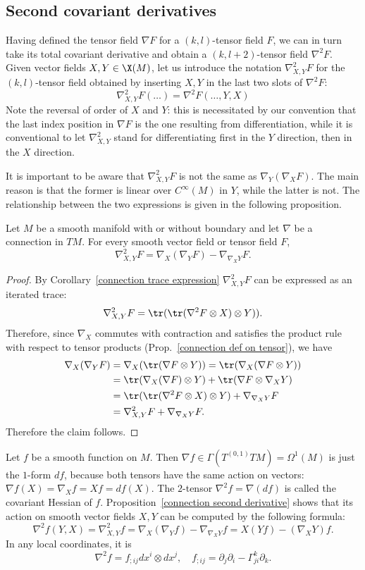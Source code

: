 \subsection{Second covariant derivatives}
Having defined the tensor field $\nabla F$ for a $(k,l)$-tensor field $F$, we can in turn take 
its total covariant derivative and obtain a $(k,l+2)$-tensor field $\nabla^2F$. Given vector 
fields $X,Y\in\X(M)$, let us introduce the notation $\nabla^2_{X,Y}F$ for the $(k,l)$-tensor 
field obtained by inserting $X,Y$ in the last two slots of $\nabla^2F$:
\[\nabla^2_{X,Y}F(\dots)=\nabla^2F(\dots,Y,X)\]
Note the reversal of order of $X$ and $Y$: this is necessitated by our convention that the 
last index position in $\nabla F$ is the one resulting from differentiation, while it is 
conventional to let $\nabla^2_{X,Y}$ stand for differentiating first in the $Y$ direction, 
then in the $X$ direction.\par
It is important to be aware that $\nabla^2_{X,Y}F$ is not the same as $\nabla_Y(\nabla_XF)$. 
The main reason is that the former is linear over $C^{\infty}(M)$ in $Y$, while the latter 
is not. The relationship between the two expressions is given in the following proposition.
\begin{proposition}\label{connection second derivative}
Let $M$ be a smooth manifold with or without boundary and let $\nabla$ be a connection in $TM$. 
For every smooth vector field or tensor field $F$,
\[\nabla^2_{X,Y}F=\nabla_X(\nabla_YF)-\nabla_{\nabla_XY}F.\]
\end{proposition}
\begin{proof}
By Corollary~\ref{connection trace expression} $\nabla^2_{X,Y}F$ can be expressed as an iterated trace:
\[\nabla^2_{X,Y}F=\tr(\tr(\nabla^2F\otimes X)\otimes Y)).\]
Therefore, since $\nabla_X$ commutes with contraction and satisfies the 
product rule with respect to tensor products (Prop.~\ref{connection def on tensor}), 
we have
\begin{align*}
\nabla_{X}(\nabla_YF)&=\nabla_X(\tr(\nabla F\otimes Y))=\tr(\nabla_X(\nabla F\otimes Y))\\
&=\tr(\nabla_X(\nabla F)\otimes Y)+\tr(\nabla F\otimes\nabla_XY)\\
&=\tr(\tr(\nabla^2F\otimes X)\otimes Y)+\nabla_{\nabla_XY}F\\
&=\nabla^2_{X,Y}F+\nabla_{\nabla_XY}F.
\end{align*}
Therefore the claim follows.
\end{proof}
\begin{example}\label{covariant Hessian}
Let $f$ be a smooth function on $M$. Then $\nabla f\in\Gamma(T^{(0,1)}TM)=\Omega^1(M)$ 
is just the $1$-form $df$, because both tensors have the same action on vectors: 
$\nabla f(X)=\nabla_Xf=Xf=df(X)$. The $2$-tensor $\nabla^2f=\nabla(df)$ is 
called the covariant Hessian of $f$. Proposition~\ref{connection second derivative} 
shows that its action on smooth vector fields $X,Y$ can be computed by the 
following formula:
\[\nabla^2f(Y,X)=\nabla^2_{X,Y}f=\nabla_X(\nabla_Yf)-\nabla_{\nabla_XY}f=X(Yf)-(\nabla_XY)f.\]
In any local coordinates, it is
\[\nabla^2f=f_{;ij}dx^i\otimes dx^j,\quad f_{;ij}=\partial_j\partial_i-\Gamma_{ji}^k\partial_k.\]
\end{example}
